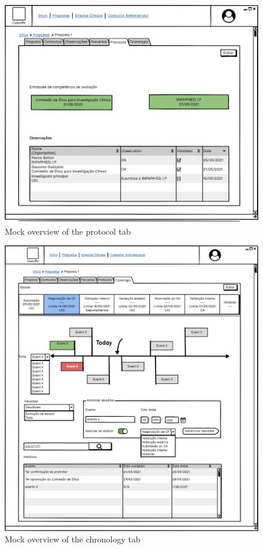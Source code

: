 \begin{figure}[H]
    \centering
    \includegraphics[scale=0.35]{images/proposta-protocolo.png}
    \caption{Mock overview of the protocol tab}
    \label{fig:proposta-protocolo}
\end{figure}

\begin{figure}[H]
    \centering
    \includegraphics[scale=0.35]{images/proposta-cronologia.png}
    \caption{Mock overview of the chronology tab}
    \label{fig:proposta-cronologia}
\end{figure}



